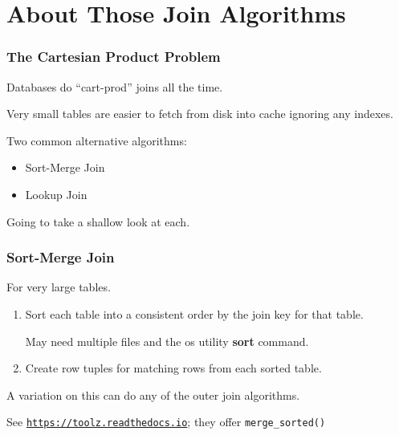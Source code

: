 \documentclass{beamer}
\begin{document}
\section{About Those Join Algorithms}
\begin{frame}
    \frametitle{The Cartesian Product Problem}

    Databases do ``cart-prod'' joins all the time.

    \vspace{1em}
    Very small tables are easier to fetch from disk into cache ignoring any indexes.

    \vspace{1em}
    Two common alternative algorithms:
    \begin{itemize}
        \item Sort-Merge Join
        \item Lookup Join
    \end{itemize}

    \vspace{1em}
    Going to take a shallow look at each.
\end{frame}

\begin{frame}
    \frametitle{Sort-Merge Join}

    For very large tables.

    \begin{enumerate}
    \item Sort each table into a consistent order by the join key for that table.

    May need multiple files and the os utility \textbf{sort} command.

    \item Create row tuples for matching rows from each sorted table.
    \end{enumerate}

    \vspace{1em}

    A variation on this can do any of the outer join algorithms.

    \vspace{1em}

    See \texttt{\underline{https://toolz.readthedocs.io}}; they offer \texttt{merge\_sorted()}

\end{frame}
\end{document}
